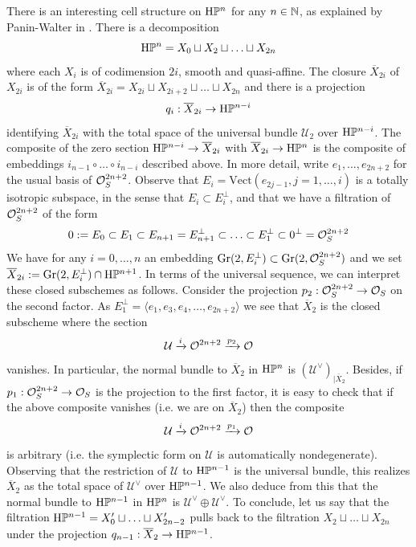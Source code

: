\begin{num}
There is an interesting cell structure on $\mathrm{H}\mathbb P^n$ for any $n\in\mathbb{N}$, as explained by Panin-Walter in \cite{PWQuaternionic}. There is a decomposition
\[
\mathrm{H}\mathbb P^n=X_0\sqcup X_2\sqcup \ldots\sqcup X_{2n}
\]
where each $X_i$ is of codimension $2i$, smooth and quasi-affine. The closure $\overline X_{2i}$ of $X_{2i}$ is of the form $\overline X_{2i}=X_{2i}\sqcup X_{2i+2}\sqcup\ldots\sqcup X_{2n}$ and there is a projection
\[
q_i:\overline X_{2i}\to \mathrm{H}\mathbb P^{n-i}
\]
identifying $\overline X_{2i}$ with the total space of the universal bundle $\mathcal U_2$ over $\mathrm{H}\mathbb P^{n-i}$. The composite of the zero section $\mathrm{H}\mathbb P^{n-i}\to \overline X_{2i}$ with $\overline X_{2i}\to \mathrm{H}\mathbb P^{n}$ is the composite of embeddings $i_{n-1}\circ\ldots\circ i_{n-i}$ described above. In more detail, write $e_1,\ldots,e_{2n+2}$ for the usual basis of $\mathcal O_S^{2n+2}$. Observe that $E_i=\mathrm{Vect}(e_{2j-1},j=1,\ldots,i)$ is a totally isotropic subspace, in the sense that $E_i\subset E_i^\perp$, and that we have a filtration of $\mathcal O_S^{2n+2}$ of the form
\[
0:=E_0\subset E_1\subset E_{n+1}=E_{n+1}^\perp\subset \ldots\subset E_1^\perp\subset 0^\perp=\mathcal O_S^{2n+2}
\]
We have for any $i=0,\ldots,n$ an embedding $\mathrm{Gr}(2,E_i^{\perp})\subset \mathrm{Gr}(2,\mathcal O_S^{2n+2})$ and we set $\overline X_{2i}:=\mathrm{Gr}(2,E_i^{\perp})\cap \mathrm{H}\mathbb P^{n+1}$. In terms of the universal sequence, we can interpret these closed subschemes as follows. Consider the projection $p_2:\mathcal O_S^{2n+2}\to \mathcal O_S$ on the second factor. As $E_1^\perp=\langle e_1,e_3,e_4,\ldots,e_{2n+2}\rangle$ we see that $\overline X_2$ is the closed subscheme where the section
\[
\mathcal{U}\xrightarrow{i} \mathcal O^{2n+2}\xrightarrow{p_2} \mathcal O
\]
vanishes. In particular, the normal bundle to $\overline X_2$ in $\mathrm{H}\mathbb P^n$ is $(\mathcal{U}^\vee)_{\vert \overline X_2}$. Besides, if $p_1:\mathcal O_S^{2n+2}\to \mathcal O_S$ is the projection to the first factor, it is easy to check that if the above composite vanishes (i.e. we are on $\overline X_2$) then the composite 
\[
\mathcal{U}\xrightarrow{i} \mathcal O^{2n+2}\xrightarrow{p_1} \mathcal O
\]
is arbitrary (i.e. the symplectic form on $\mathcal{U}$ is automatically nondegenerate). Observing that the restriction of $\mathcal{U}$ to $\mathrm{H}\mathbb P^{n-1}$ is the universal bundle, this realizes $\overline X_2$ as the total space of $\mathcal{U}^\vee$ over $\mathrm{H}\mathbb P^{n-1}$. We also deduce from this that the normal bundle to $\mathrm{H}\mathbb P^{n-1}$ in $\mathrm{H}\mathbb P^{n}$ is $\mathcal{U}^\vee\oplus \mathcal{U}^\vee$. To conclude, let us say that the filtration $\mathrm{H}\mathbb P^{n-1}=X^\prime_0\sqcup\ldots \sqcup X^\prime_{2n-2}$ pulls back to the filtration $X_2\sqcup\ldots \sqcup X_{2n}$ under the projection $q_{n-1}:\overline X_2\to \mathrm{H}\mathbb P^{n-1}$. 


\end{num}
